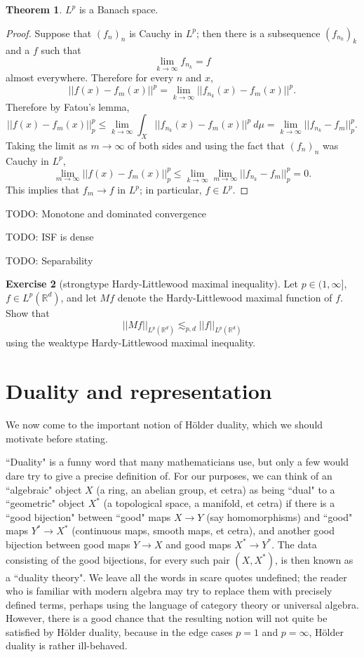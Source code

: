 \documentclass[12pt]{book}
\newcommand{\RR}{\mathbb{R}}
\theoremstyle{definition}
\newtheorem{theorem}{Theorem}[section]
\newtheorem{exercise}[theorem]{Exercise}
\begin{document}
\begin{theorem}
$L^p$ is a Banach space.
\end{theorem}
\begin{proof}
Suppose that $(f_n)_n$ is Cauchy in $L^p$; then there is a subsequence $(f_{n_k})_k$ and a $f$ such that
$$\lim_{k \to \infty} f_{n_k} = f$$
almost everywhere. Therefore for every $n$ and $x$,
$$||f(x) - f_m(x)||^p = \lim_{k \to \infty} ||f_{n_k}(x) - f_m(x)||^p.$$
Therefore by Fatou's lemma,
$$||f(x) - f_m(x)||_p^p \leq \lim_{k \to \infty} \int_X ||f_{n_k}(x) - f_m(x)||^p~d\mu = \lim_{k \to \infty} ||f_{n_k} - f_m||_p^p.$$
Taking the limit as $m \to \infty$ of both sides and using the fact that $(f_n)_n$ was Cauchy in $L^p$,
$$\lim_{m \to \infty} ||f(x) - f_m(x)||_p^p \leq \lim_{k \to \infty} \lim_{m \to \infty} ||f_{n_k} - f_m||_p^p = 0.$$
This implies that $f_m \to f$ in $L^p$; in particular, $f \in L^p$.
\end{proof}

TODO: Monotone and dominated convergence

TODO: ISF is dense

TODO: Separability

\begin{exercise}[strongtype Hardy-Littlewood maximal inequality]
Let $p \in (1, \infty]$, $f \in L^p(\RR^d)$, and let $Mf$ denote the Hardy-Littlewood maximal function of $f$.
Show that
$$||Mf||_{L^p(\RR^d)} \lesssim_{p,d} ||f||_{L^p(\RR^d)}$$
using the weaktype Hardy-Littlewood maximal inequality.
\end{exercise}

\section{Duality and representation}
We now come to the important notion of H\"older duality, which we should motivate before stating.

``Duality" is a funny word that many mathematicians use, but only a few would dare try to give a precise definition of.
For our purposes, we can think of an ``algebraic" object $X$ (a ring, an abelian group, et cetra) as being ``dual" to a ``geometric" object $X^*$ (a topological space, a manifold, et cetra) if there is a ``good bijection" between ``good" maps $X \to Y$ (say homomorphisms) and ``good" maps $Y^* \to X^*$ (continuous maps, smooth maps, et cetra), and another good bijection between good maps $Y \to X$ and good maps $X^* \to Y^*$.
The data consisting of the good bijections, for every such pair $(X, X^*)$, is then known as a ``duality theory".
We leave all the words in scare quotes undefined; the reader who is familiar with modern algebra may try to replace them with precisely defined terms, perhaps using the language of category theory or universal algebra.
However, there is a good chance that the resulting notion will not quite be satisfied by H\"older duality, because in the edge cases $p = 1$ and $p = \infty$, H\"older duality is rather ill-behaved.
\end{document}
